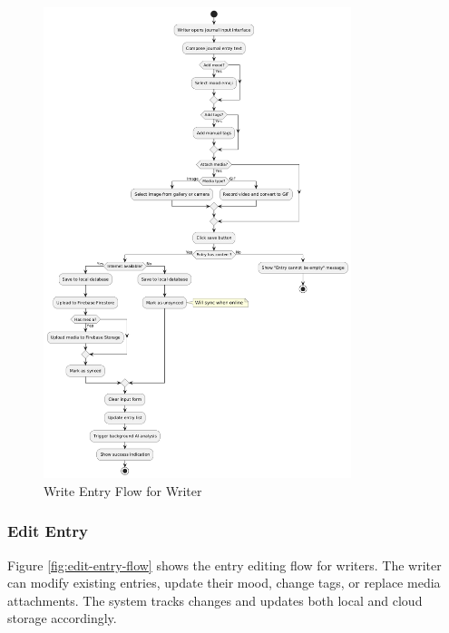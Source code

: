 \begin{figure}[H]
\centering
\includegraphics[width=0.8\textwidth]{files/imgs/write_entry_flow.png}
\caption{Write Entry Flow for Writer}
\label{fig:write-entry-flow}
\end{figure}

\subsubsection{Edit Entry}\label{subsubsec:editEntry}

Figure \ref{fig:edit-entry-flow} shows the entry editing flow for writers. The writer can modify existing entries, update their mood, change tags, or replace media attachments. The system tracks changes and updates both local and cloud storage accordingly.

